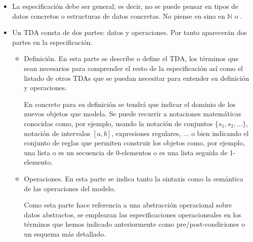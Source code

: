 \begin{itemize}
\item La especificación debe ser general; es decir, no se puede pensar en tipos de datos concretos o estructuras de datos concretas. No piense en  sino en $\mathbb{N}$ o .
\item Un TDA consta de dos partes: datos y operaciones. Por tanto aparecerán dos partes en la especificación.
\begin{itemize}
\item Definición. En esta parte se describe o define el TDA, los términos que sean necesarios para comprender el resto de la especificación así como el listado de otros TDAs que se puedan necesitar para entender su definición y operaciones.

En concreto para su definición se tendrá que indicar el dominio de los nuevos objetos que modela. Se puede recurrir a notaciones matemáticas conocidas como, por ejemplo, usando la notación de conjuntos $\{s_1,s_2,\ldots\}$, notación de intervalos $[a, b]$, expresiones regulares, ... o bien indicando el conjunto de reglas que permiten construir los objetos como, por ejemplo, una lista o es un secuencia de 0-elementos o es una lista seguida de 1-elemento.

\item Operaciones. En esta parte se indica tanto la sintaxis como la semántica de las operaciones del modelo.

Como esta parte hace referencia a una abstracción operacional sobre datos abstractos, se emplearan las especificaciones operacioneales en los términos que hemos indicado anteriormente como pre/post-condiciones o un esquema más detallado.
\end{itemize}

\end{itemize}


